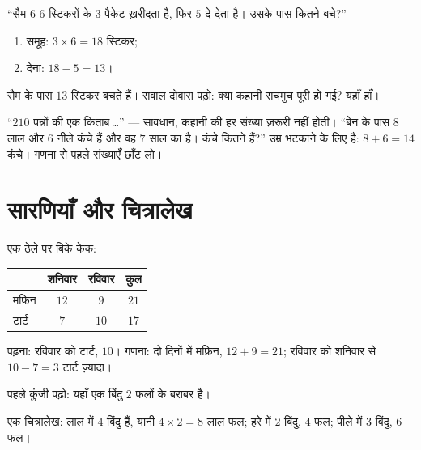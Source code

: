 \begin{example}\label{ex:g2:problems:twostep}
``सैम $6$-$6$ स्टिकरों के $3$ पैकेट ख़रीदता है, फिर $5$ दे देता
है। उसके पास कितने बचे?''
\begin{enumerate}
  \item समूह: $3 \times 6 = 18$ स्टिकर;
  \item देना: $18 - 5 = 13$।
\end{enumerate}
सैम के पास $13$ स्टिकर बचते हैं। सवाल दोबारा पढ़ो: क्या कहानी
सचमुच पूरी हो गई? यहाँ हाँ।
\end{example}

\begin{example}[एक छिपी हुई फ़ालतू संख्या]\label{ex:g2:problems:extra}
``$210$ पन्नों की एक किताब\,\dots'' --- सावधान, कहानी की हर
संख्या ज़रूरी नहीं होती। ``बेन के पास $8$ लाल और $6$ नीले कंचे
हैं और वह $7$ साल का है। कंचे कितने हैं?'' उम्र भटकाने के लिए
है: $8 + 6 = 14$ कंचे। गणना से पहले संख्याएँ छाँट लो।
\end{example}

\section{सारणियाँ और चित्रालेख}

\begin{example}[एक सारणी]\label{ex:g2:problems:table}
एक ठेले पर बिके केक:
\begin{center}
\renewcommand{\arraystretch}{1.3}
\begin{tabular}{l|ccc}
 & शनिवार & रविवार & कुल \\
\hline
मफ़िन & $12$ & $9$ & $21$ \\
टार्ट & $7$ & $10$ & $17$ \\
\end{tabular}
\end{center}
पढ़ना: रविवार को टार्ट, $10$। गणना: दो दिनों में मफ़िन,
$12 + 9 = 21$; रविवार को शनिवार से $10 - 7 = 3$ टार्ट ज़्यादा।
\end{example}

\begin{example}[एक चित्रालेख]\label{ex:g2:problems:pictogram}
पहले कुंजी पढ़ो: यहाँ एक बिंदु $2$ फलों के बराबर है।

\begin{omfigure}

{\small एक चित्रालेख: लाल में $4$ बिंदु हैं, यानी $4 \times 2 = 8$
लाल फल; हरे में $2$ बिंदु, $4$ फल; पीले में $3$ बिंदु, $6$ फल।}
\end{omfigure}
\end{example}

